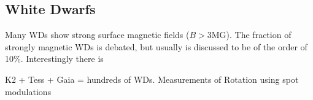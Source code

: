 {\color{red} \subsection{White Dwarfs}}
Many WDs show strong surface magnetic fields ($B>$3MG). The fraction of strongly magnetic WDs is debated, but usually is discussed to be of the order of 10\%. Interestingly there is  

K2 + Tess + Gaia = hundreds of WDs. Measurements of Rotation using spot modulations